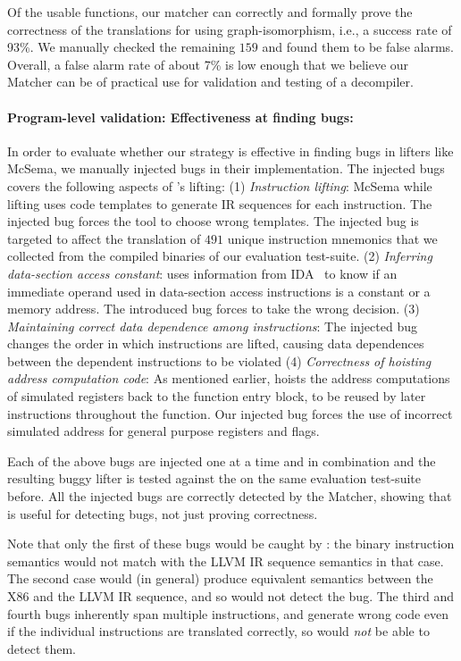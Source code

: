 Of the \plvT usable functions, our matcher can correctly and formally 
prove the correctness of the translations for \plvP using graph-isomorphism, 
i.e., a success rate of 93\%.
We manually checked the remaining $159$ and found them to be false alarms.
Overall, a false alarm rate of about 7\% is low enough that we believe
our Matcher can be of practical use for validation and testing of a decompiler.

\paragraph{Program-level validation: Effectiveness at finding bugs:}
%
In order to evaluate whether our strategy is effective in finding bugs in lifters like 
McSema, we manually injected bugs in their implementation. The injected bugs 
covers the following aspects of \mcsema's lifting: (1) \emph{Instruction 
lifting}: McSema 
while lifting uses code templates to generate IR sequences for each instruction. 
The injected bug forces the tool to choose wrong templates. The injected bug is 
targeted to affect the translation of $491$ unique instruction mnemonics that 
we collected from the compiled binaries of our evaluation test-suite.   
%
(2) \emph{Inferring data-section access constant}: \mcsema uses information from 
IDA~\cite{IDA} to know if an immediate operand used in data-section access 
instructions is a constant or a memory address. The introduced bug forces 
\mcsema to take the wrong decision.
%
(3) \emph{Maintaining 
correct data dependence among instructions}: The injected bug changes the 
order in which instructions are lifted, causing
data dependences between the dependent instructions to be violated
%
(4) \emph{Correctness of hoisting address computation code}: 
As mentioned earlier, 
\mcsema hoists the address computations of simulated registers back to the function
entry block, to be reused by 
later instructions throughout the function. Our injected bug forces 
the use of incorrect simulated address for general purpose registers and flags.

Each of the above bugs are injected one at a time and in combination and the 
resulting buggy lifter is tested against the \compd on the same evaluation 
test-suite before. All the injected bugs are correctly detected by the Matcher,
showing that \plv is useful for detecting bugs, not just proving correctness.

Note that only the first of these bugs would be caught by \siv: the binary instruction
semantics would not match with the LLVM IR sequence semantics in that case.
The second case would (in general) produce equivalent semantics between the X86 and
the LLVM IR sequence, and so \siv would not detect the bug.
The third and fourth bugs inherently span multiple instructions, and generate 
wrong code even if the individual instructions are translated correctly, so \siv 
would \emph{not} be able to detect them.
